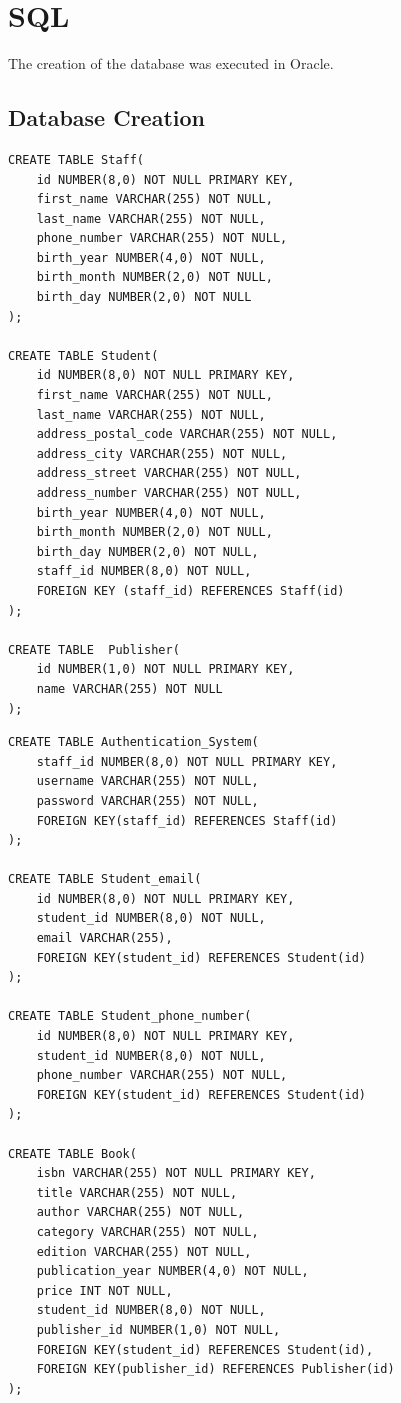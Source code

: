 \documentclass[11pt]{article}
\begin{document}
	\newpage
	\section{SQL}
		The creation of the database was executed in Oracle.
		\subsection{Database Creation}
			\begin{verbatim}
CREATE TABLE Staff(
    id NUMBER(8,0) NOT NULL PRIMARY KEY,
    first_name VARCHAR(255) NOT NULL,
    last_name VARCHAR(255) NOT NULL,
    phone_number VARCHAR(255) NOT NULL,
    birth_year NUMBER(4,0) NOT NULL,
    birth_month NUMBER(2,0) NOT NULL,
    birth_day NUMBER(2,0) NOT NULL
);

CREATE TABLE Student(
    id NUMBER(8,0) NOT NULL PRIMARY KEY,
    first_name VARCHAR(255) NOT NULL,
    last_name VARCHAR(255) NOT NULL,
    address_postal_code VARCHAR(255) NOT NULL,
    address_city VARCHAR(255) NOT NULL,
    address_street VARCHAR(255) NOT NULL,
    address_number VARCHAR(255) NOT NULL,
    birth_year NUMBER(4,0) NOT NULL,
    birth_month NUMBER(2,0) NOT NULL,
    birth_day NUMBER(2,0) NOT NULL,
    staff_id NUMBER(8,0) NOT NULL,
    FOREIGN KEY (staff_id) REFERENCES Staff(id)
);

CREATE TABLE  Publisher(
    id NUMBER(1,0) NOT NULL PRIMARY KEY,
    name VARCHAR(255) NOT NULL
);
			\end{verbatim}
				
			\newpage
			\begin{verbatim}
CREATE TABLE Authentication_System(
    staff_id NUMBER(8,0) NOT NULL PRIMARY KEY,
    username VARCHAR(255) NOT NULL,
    password VARCHAR(255) NOT NULL,
    FOREIGN KEY(staff_id) REFERENCES Staff(id)
);

CREATE TABLE Student_email(
    id NUMBER(8,0) NOT NULL PRIMARY KEY,
    student_id NUMBER(8,0) NOT NULL,
    email VARCHAR(255),
    FOREIGN KEY(student_id) REFERENCES Student(id)
);

CREATE TABLE Student_phone_number(
    id NUMBER(8,0) NOT NULL PRIMARY KEY,
    student_id NUMBER(8,0) NOT NULL,
    phone_number VARCHAR(255) NOT NULL,
    FOREIGN KEY(student_id) REFERENCES Student(id)
);

CREATE TABLE Book(
    isbn VARCHAR(255) NOT NULL PRIMARY KEY,
    title VARCHAR(255) NOT NULL,
    author VARCHAR(255) NOT NULL,
    category VARCHAR(255) NOT NULL,
    edition VARCHAR(255) NOT NULL,
    publication_year NUMBER(4,0) NOT NULL,
    price INT NOT NULL,
    student_id NUMBER(8,0) NOT NULL,
    publisher_id NUMBER(1,0) NOT NULL,
    FOREIGN KEY(student_id) REFERENCES Student(id),
    FOREIGN KEY(publisher_id) REFERENCES Publisher(id)
);
			\end{verbatim}
			
\end{document}
